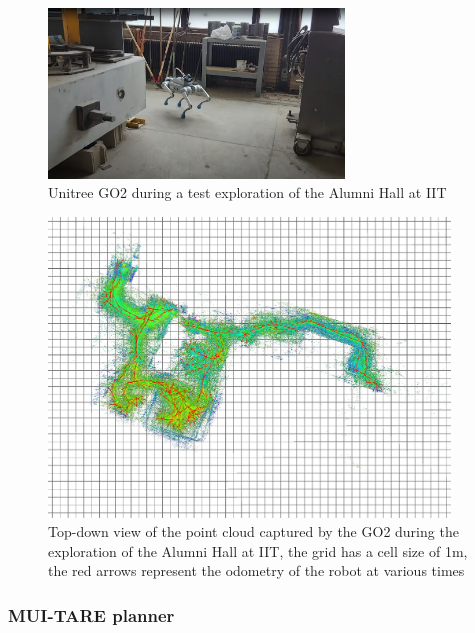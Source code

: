 \documentclass[12pt]{article}
\begin{document}
        \begin{figure}[H]
            \centering
            \includegraphics[width=0.7\textwidth]{Images/GO2_exploring_alumni.png}
            \caption{Unitree GO2 during a test exploration of the Alumni Hall at IIT}
            \label{fig:tare_iit_exploration}
        \end{figure}

        

        \begin{figure}[H]
            \centering
            \includegraphics[width=0.95\textwidth]{Images/map_explore_alumni_no_bg.png}
            \caption{Top-down view of the point cloud captured by the GO2 during the exploration of the Alumni Hall at IIT, the grid has a cell size of 1m, the red arrows represent the odometry of the robot at various times}
            \label{fig:tare_iit_map}
        \end{figure}



        
        \subsubsection{MUI-TARE planner}
\end{document}

